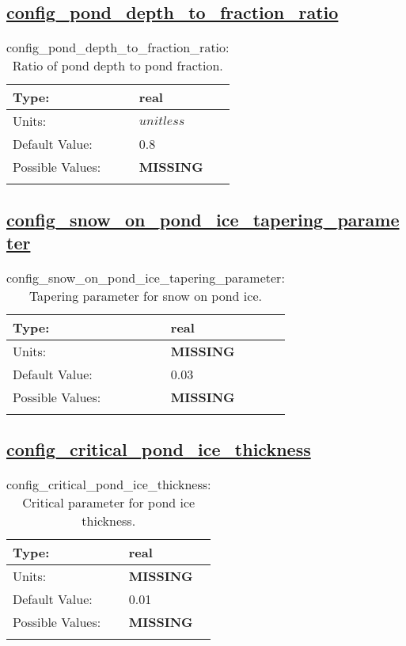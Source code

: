 \subsection[config\_pond\_depth\_to\_fraction\_ratio]{\hyperref[sec:nm_tab_meltponds]{config\_pond\_depth\_to\_fraction\_ratio}}
\label{subsec:nm_sec_config_pond_depth_to_fraction_ratio}
\begin{center}
\begin{longtable}{| p{2.0in} || p{4.0in} |}
    \hline
    Type: & real \\
    \hline
    Units: & $unitless$ \\
    \hline
    Default Value: & 0.8 \\
    \hline
    Possible Values: & {\bf \color{red} MISSING} \\
    \hline
    \caption{config\_pond\_depth\_to\_fraction\_ratio: Ratio of pond depth to pond fraction.}
\end{longtable}
\end{center}
\subsection[config\_snow\_on\_pond\_ice\_tapering\_parameter]{\hyperref[sec:nm_tab_meltponds]{config\_snow\_on\_pond\_ice\_tapering\_parameter}}
\label{subsec:nm_sec_config_snow_on_pond_ice_tapering_parameter}
\begin{center}
\begin{longtable}{| p{2.0in} || p{4.0in} |}
    \hline
    Type: & real \\
    \hline
    Units: & {\bf \color{red} MISSING} \\
    \hline
    Default Value: & 0.03 \\
    \hline
    Possible Values: & {\bf \color{red} MISSING} \\
    \hline
    \caption{config\_snow\_on\_pond\_ice\_tapering\_parameter: Tapering parameter for snow on pond ice.}
\end{longtable}
\end{center}
\subsection[config\_critical\_pond\_ice\_thickness]{\hyperref[sec:nm_tab_meltponds]{config\_critical\_pond\_ice\_thickness}}
\label{subsec:nm_sec_config_critical_pond_ice_thickness}
\begin{center}
\begin{longtable}{| p{2.0in} || p{4.0in} |}
    \hline
    Type: & real \\
    \hline
    Units: & {\bf \color{red} MISSING} \\
    \hline
    Default Value: & 0.01 \\
    \hline
    Possible Values: & {\bf \color{red} MISSING} \\
    \hline
    \caption{config\_critical\_pond\_ice\_thickness: Critical parameter for pond ice thickness.}
\end{longtable}
\end{center}
